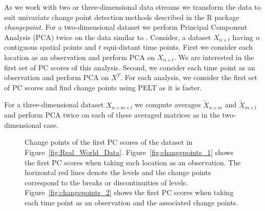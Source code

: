 \documentclass[a4paper,11pt]{article}
\begin{document}
As we work with two or three-dimensional data streams we transform the data to suit univariate change point detection methods described in the R package \textit{changepoint}. For a two-dimensional dataset we perform Principal Component Analysis (PCA) twice on the data similar to \cite{FSSKKSMJK}. Consider, a dataset $X_{n \times t}$ having $n$ contiguous spatial points and $t$ equi-distant time points. First we consider each location as an observation and perform PCA on $X_{n \times t}$. We are interested in the first set of PC scores of this analysis. Second, we consider each time point as an observation and perform PCA on $X^T$. For each analysis, we consider the first set of PC scores and find change points using PELT as it is faster.

For a three-dimensional dataset $X_{n\times m \times l}$ we compute averages $\tilde{X}_{n \times m}$ and $\tilde{X}_{m \times l}$ and perform PCA twice on each of these averaged matrices as in the two-dimensional case.

\begin{figure}
	\centering
	\caption{Change points of the first PC scores of the dataset in Figure~\ref{fig:Real_World_Data}. Figure~\ref{fig:changepoints_1} shows the first PC scores when taking each location as an observation. The horizontal red lines denote the levels and the change points correspond to the breaks or discontinuities of levels. Figure~\ref{fig:changepoints_2} shows the first PC scores when taking each time point as an observation and the associated change points.}
	\label{fig:changepoints}
\end{figure}
\end{document}
